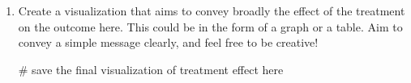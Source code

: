 \documentclass[
  letterpaper,
  DIV=11,
  numbers=noendperiod]{scrartcl}
\newenvironment{Shaded}{\begin{snugshade}}{\end{snugshade}}
\newcommand{\CommentTok}[1]{\textcolor[rgb]{0.37,0.37,0.37}{#1}}
\begin{document}
\begin{enumerate}
  Note that, for our purposes, we are interested only in the columns
  labeled ``treatment,'' ``control,'' and ``amount.'' However, you may
  find it interesting to explore the rest of the data. Graphs such as
  barplots and density plots, contingency tables and summary statistics
  may be good starting points.

\begin{Shaded}
\begin{Highlighting}[]
\CommentTok{\# save any exploratory analysis you do here}
\end{Highlighting}
\end{Shaded}
\item
  Create a visualization that aims to convey broadly the effect of the
  treatment on the outcome here. This could be in the form of a graph or
  a table. Aim to convey a simple message clearly, and feel free to be
  creative!

\begin{Shaded}
\begin{Highlighting}[]
\CommentTok{\# save the final visualization of treatment effect here }
\end{Highlighting}
\end{Shaded}
\end{enumerate}
\end{document}
